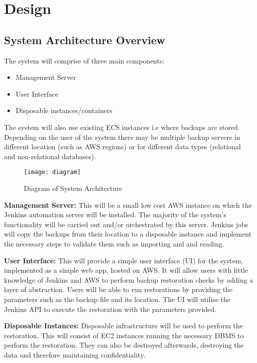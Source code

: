 \section{Design}
	\subsection{System Architecture Overview}
		The system will comprise of three main components:
		\begin{itemize}
			\item Management Server
			\item User Interface
			\item Disposable instances/containers
		\end{itemize}
		The system will also use existing ECS instances i.e  where backups are stored. Depending on the user of the system there may be multiple backup servers in different location (such as AWS regions) or for different data types (relational and non-relational databases).
		
		\begin{figure}[H]
			\setlength{\belowcaptionskip}{15pt plus 3pt minus 2pt}
			\caption{Diagram of System Architecture}
			\centering
			\texttt{[image: diagram]}
			\label{fig:diagram}
		\end{figure}
		
		\noindent \textbf{Management Server:} This will be a small low cost AWS instance on which the Jenkins automation server will be installed. The majority of the system's functionality will be carried out and/or orchestrated by this server. Jenkins jobs will copy the backups from their location to a disposable instance and implement the necessary steps to validate them such as importing and and reading.
		
		\noindent \textbf{User Interface:} This will provide a simple user interface (UI) for the system, implemented as a simple web app, hosted on AWS. It will allow users with little knowledge of Jenkins and AWS to perform backup restoration checks by adding a layer of abstraction. Users will be able to run restorations by providing the parameters such as the backup file and its location. The UI will utilise the Jenkins API to execute the restoration with the parameters provided.
		
		\noindent\textbf{Disposable Instances:} Disposable infrastructure will be used to perform the restoration. This will consist of EC2 instances running the necessary DBMS to perform the restoration. They can also be destroyed afterwards, destroying the data and therefore maintaining confidentiality.


